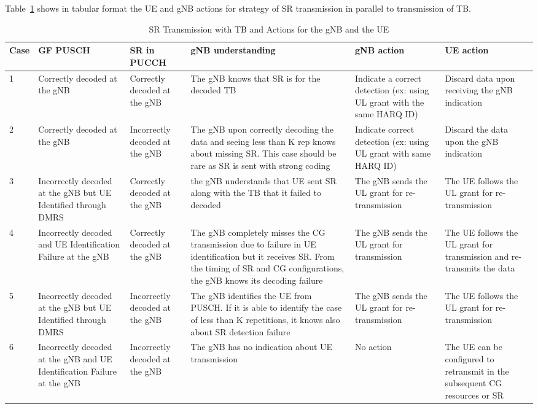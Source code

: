 \documentclass[conference]{IEEEtran}
\begin{document}
Table~\ref{tab1} shows in tabular format the UE and gNB actions for strategy of SR transmission in parallel to transmission of TB. 

\begin{table}[htbp]
\caption{SR Transmission with TB and Actions for the gNB and the UE}
\begin{center}
\begin{tabular}{|p{1.5em}|p{9em}|p{9em}|p{12em}|p{9em}|p{9em}|}
 \hline
 \textbf{Case} & \textbf{GF PUSCH} & \textbf{SR in PUCCH} & \textbf{gNB understanding} & \textbf{gNB action} & \textbf{UE action}\\ 
 \hline
 1 & Correctly decoded at the gNB & Correctly decoded at the gNB & The gNB knows that SR is for the decoded TB & Indicate a correct detection (ex: using UL grant with the same HARQ ID) & Discard data upon receiving the gNB indication\\
 \hline
 2 &  Correctly decoded at the gNB & Incorrectly decoded at the gNB & The gNB upon correctly decoding the data and seeing less than K rep knows about missing SR. This case should be rare as SR is sent with strong coding & Indicate correct detection (ex: using UL grant with same HARQ ID) & Discard the data upon the gNB indication\\
\hline
3 & Incorrectly decoded at the gNB but UE Identified through DMRS & Correctly decoded at the gNB & the gNB understands that UE sent SR along with the TB that it failed to decoded & The gNB sends the UL grant for re-transmission & The UE follows the UL grant for re-transmission\\
\hline
4 & Incorrectly decoded and UE Identification Failure at the gNB & Correctly decoded at the gNB & The gNB completely misses the CG transmission due to failure in UE identification but it receives SR. From the timing of SR and CG configurations, the gNB knows its decoding failure & The gNB sends the UL grant for transmission & The UE follows the UL grant for transmission and re-transmits the data\\
\hline
5 & Incorrectly decoded at the gNB but UE Identified through DMRS & Incorrectly decoded at the gNB & The gNB identifies the UE from PUSCH. If it is able to identify the case of less than K repetitions, it knows also about SR detection failure & The gNB sends the UL grant for re-transmission & The UE follows the UL grant for re-transmission\\
\hline
 6 & Incorrectly decoded at the gNB and UE Identification Failure at the gNB & Incorrectly decoded at the gNB & The gNB has no indication about UE transmission & No action & The UE can be configured to
retransmit in the subsequent CG resources or SR\\
 

 
 \hline
\end{tabular}
\label{tab1}
\end{center}
\end{table}
\end{document}
